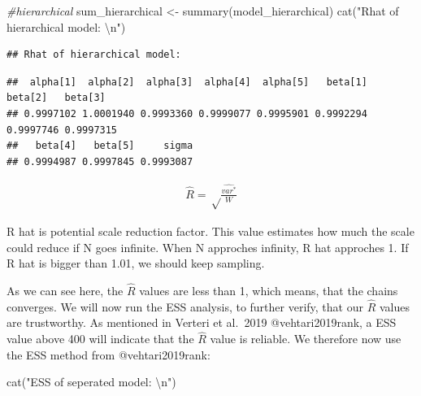 \documentclass[
]{article}
\newenvironment{Shaded}{\begin{snugshade}}{\end{snugshade}}
\newcommand{\CommentTok}[1]{\textcolor[rgb]{0.56,0.35,0.01}{\textit{#1}}}
\newcommand{\DecValTok}[1]{\textcolor[rgb]{0.00,0.00,0.81}{#1}}
\newcommand{\FunctionTok}[1]{\textcolor[rgb]{0.00,0.00,0.00}{#1}}
\newcommand{\NormalTok}[1]{#1}
\newcommand{\OtherTok}[1]{\textcolor[rgb]{0.56,0.35,0.01}{#1}}
\newcommand{\SpecialCharTok}[1]{\textcolor[rgb]{0.00,0.00,0.00}{#1}}
\newcommand{\StringTok}[1]{\textcolor[rgb]{0.31,0.60,0.02}{#1}}
\begin{document}
\begin{Shaded}
\begin{Highlighting}[]
\CommentTok{\#hierarchical}
\NormalTok{sum\_hierarchical }\OtherTok{\textless{}{-}} \FunctionTok{summary}\NormalTok{(model\_hierarchical)}
\FunctionTok{cat}\NormalTok{(}\StringTok{"Rhat of hierarchical model: }\SpecialCharTok{\textbackslash{}n}\StringTok{"}\NormalTok{)}
\end{Highlighting}
\end{Shaded}

\begin{verbatim}
## Rhat of hierarchical model:
\end{verbatim}

\begin{Shaded}
\end{Shaded}

\begin{verbatim}
##  alpha[1]  alpha[2]  alpha[3]  alpha[4]  alpha[5]   beta[1]   beta[2]   beta[3] 
## 0.9997102 1.0001940 0.9993360 0.9999077 0.9995901 0.9992294 0.9997746 0.9997315 
##   beta[4]   beta[5]     sigma 
## 0.9994987 0.9997845 0.9993087
\end{verbatim}

\[
\begin{aligned}
\hat{R} = \sqrt\frac{\hat{var^*}}{W}
\end{aligned}
\]

R hat is potential scale reduction factor. This value estimates how much
the scale could reduce if N goes infinite. When N approches infinity, R
hat approches 1. If R hat is bigger than 1.01, we should keep sampling.

As we can see here, the \(\hat{R}\) values are less than 1, which means,
that the chains converges. We will now run the ESS analysis, to further
verify, that our \(\hat{R}\) values are trustworthy. As mentioned in
Verteri et al.~2019 @vehtari2019rank, a ESS value above 400 will
indicate that the \(\hat{R}\) value is reliable. We therefore now use
the ESS method from @vehtari2019rank:

\begin{Shaded}
\begin{Highlighting}[]
\FunctionTok{cat}\NormalTok{(}\StringTok{"ESS of seperated model: }\SpecialCharTok{\textbackslash{}n}\StringTok{"}\NormalTok{)}
\end{Highlighting}
\end{Shaded}
\end{document}
